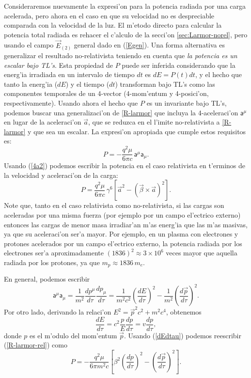 Consideraremos nuevamente la expresi'on para la potencia radiada por una carga acelerada, pero ahora en el caso en que su velocidad no es despreciable comparada con la velocidad de la luz. El m'etodo directo para calcular la
potencia total radiada es rehacer el c'alculo de la secci'on \ref{sec:Larmor-norel}, pero usando el campo $\vec{E}_{(2)}$ general dado en (\ref{Egen}). Una forma alternativa es generalizar el resultado no-relativista teniendo en cuenta que \textit{la potencia es un escalar bajo TL's}. Esta propiedad de $P$ puede ser inferida considerando que la energ'ia irradiada en un intervalo de tiempo $dt$ es $dE=P(t)dt$, y el hecho que tanto la energ'ia ($dE$) y el tiempo ($dt$) transforman bajo TL's como las componentes temporales de un 4-vector (4-mom'entum y 4-posici'on, respectivamente). Usando ahora el hecho que $P$ es un invariante bajo TL's, podemos buscar una generalizaci'on de \eqref{R-larmor} que incluya la 4-aceleraci'on $\mathsf{a}^\mu$ en lugar de la aceleraci'on $\vec{a}$, que se reduzca en el l'imite no-relativista a \eqref{R-larmor} y que sea un escalar. La expresi'on apropiada que cumple estos requisitos es:
\begin{equation}
\boxed{P=-\frac{q^2\mu}{6\pi c}\,\mathsf{a}^\mu\mathsf{a}_\mu.}\label{R-larmor-rel}%
\end{equation}
Usando (\ref{4a2}) podemos escribir la potencia en el caso
relativista en t'erminos de la velocidad y aceleraci'on de la carga:
\begin{equation}
\boxed{P=\frac{q^2\mu}{6\pi c}\,\gamma^6\left[ \vec{a}^2-\left(\vec{\beta}\times\vec{a}\right)^2\right] .}\label{R-larmor2}%
\end{equation}
Note que, tanto en el caso relativista como no-relativista, si las cargas son
aceleradas por una misma fuerza (por ejemplo por un campo el'ectrico externo)
entonces las cargas de menor masa irradiar'an m'as energ'ia que las m'as
masivas, ya que su aceleraci'on ser'a mayor. Por ejemplo, en un plasma con
electrones y protones acelerados por un campo el'ectrico externo, la potencia
radiada por los electrones ser'a aproximadamente $(1836)^2\approx 3\times
10^{6}$ veces mayor que aquella radiada por los protones, ya que $m_p\approx
1836\,m_e$.

En general, podemos escribir
\begin{equation}
\mathsf{a}^\mu\mathsf{a}_\mu=\frac{1}{m^2}\frac{dp^\mu}{d\tau}\frac{dp_\mu}{
d\tau}=\frac{1}{m^2c^2}\left( \frac{dE}{d\tau}\right)^2-\frac{1}{m^2}\left(
\frac{d\vec{p}}{d\tau}\right)^2.
\end{equation}
Por otro lado, derivando la relaci'on $E^2=\vec{p}^2c^2+m^2c^4$, obtenemos
\begin{equation}
\frac{dE}{d\tau}=c^2\frac{p}{E}\frac{dp}{d\tau}=v\frac{dp}{d\tau},
\label{dEdtau}
\end{equation}
donde $p$ es el m'odulo del mom'entum $\vec{p}$. Usando (\ref{dEdtau}) podemos
reescribir (\ref{R-larmor-rel}) como
\begin{equation}
P=-\frac{q^2\mu}{6\pi m^2c}\left[ \beta^2\left(
\frac{dp}{d\tau}\right)^2-\left( \frac{d\vec{p}}{d\tau}\right)^2\right] .
\label{4a2-2}
\end{equation}

